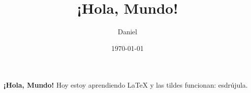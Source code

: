 \documentclass{article}
\title{¡Hola, Mundo!}
\author{Daniel}
\date{\today}
\begin{document}
\maketitle

\textbf{¡Hola, Mundo!} Hoy estoy aprendiendo \LaTeX{} y
las tildes funcionan: esdrújula.
\end{document}
